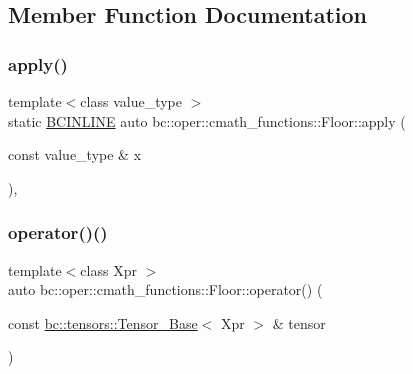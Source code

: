 \subsection{Member Function Documentation}
\mbox{\label{structbc_1_1oper_1_1cmath__functions_1_1Floor_ae537e1a340d23a7fbfcee255344bd190}} 
\subsubsection{\texorpdfstring{apply()}{apply()}}
{\footnotesize\ttfamily template$<$class value\+\_\+type $>$ \\
static \hyperlink{common_8h_a6699e8b0449da5c0fafb878e59c1d4b1}{B\+C\+I\+N\+L\+I\+NE} auto bc\+::oper\+::cmath\+\_\+functions\+::\+Floor\+::apply (\begin{DoxyParamCaption}\item[{const value\+\_\+type \&}]{x }\end{DoxyParamCaption})\hspace{0.3cm}{\ttfamily [inline]}, {\ttfamily [static]}}

\mbox{\label{structbc_1_1oper_1_1cmath__functions_1_1Floor_ae9fa29787d4f548261ab87da847e5805}} 
\subsubsection{\texorpdfstring{operator()()}{operator()()}\hspace{0.1cm}{\footnotesize\ttfamily [1/3]}}
{\footnotesize\ttfamily template$<$class Xpr $>$ \\
auto bc\+::oper\+::cmath\+\_\+functions\+::\+Floor\+::operator() (\begin{DoxyParamCaption}\item[{const \hyperlink{classbc_1_1tensors_1_1Tensor__Base}{bc\+::tensors\+::\+Tensor\+\_\+\+Base}$<$ Xpr $>$ \&}]{tensor }\end{DoxyParamCaption})\hspace{0.3cm}{\ttfamily [inline]}}

